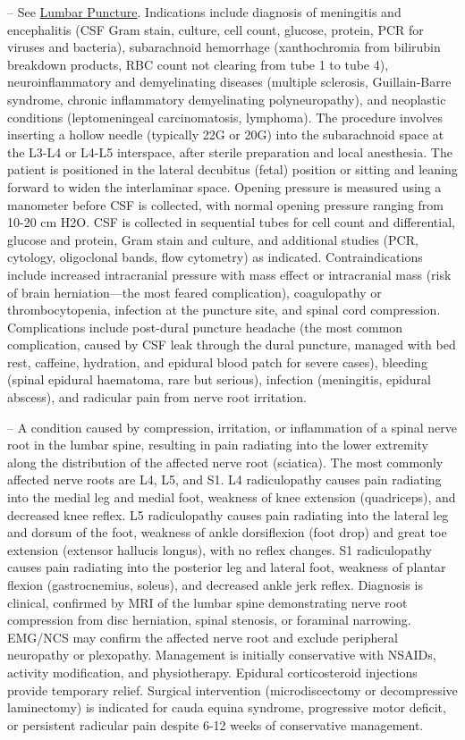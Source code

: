 -- See \hyperlink{Lumbar Puncture}{Lumbar Puncture}. Indications include diagnosis of meningitis and encephalitis (CSF Gram stain, culture, cell count, glucose, protein, PCR for viruses and bacteria), subarachnoid hemorrhage (xanthochromia from bilirubin breakdown products, RBC count not clearing from tube 1 to tube 4), neuroinflammatory and demyelinating diseases (multiple sclerosis, Guillain-Barre syndrome, chronic inflammatory demyelinating polyneuropathy), and neoplastic conditions (leptomeningeal carcinomatosis, lymphoma). The procedure involves inserting a hollow needle (typically 22G or 20G) into the subarachnoid space at the L3-L4 or L4-L5 interspace, after sterile preparation and local anesthesia. The patient is positioned in the lateral decubitus (fetal) position or sitting and leaning forward to widen the interlaminar space. Opening pressure is measured using a manometer before CSF is collected, with normal opening pressure ranging from 10-20 cm H2O. CSF is collected in sequential tubes for cell count and differential, glucose and protein, Gram stain and culture, and additional studies (PCR, cytology, oligoclonal bands, flow cytometry) as indicated. Contraindications include increased intracranial pressure with mass effect or intracranial mass (risk of brain herniation—the most feared complication), coagulopathy or thrombocytopenia, infection at the puncture site, and spinal cord compression. Complications include post-dural puncture headache (the most common complication, caused by CSF leak through the dural puncture, managed with bed rest, caffeine, hydration, and epidural blood patch for severe cases), bleeding (spinal epidural haematoma, rare but serious), infection (meningitis, epidural abscess), and radicular pain from nerve root irritation.

-- A condition caused by compression, irritation, or inflammation of a spinal nerve root in the lumbar spine, resulting in pain radiating into the lower extremity along the distribution of the affected nerve root (sciatica). The most commonly affected nerve roots are L4, L5, and S1. L4 radiculopathy causes pain radiating into the medial leg and medial foot, weakness of knee extension (quadriceps), and decreased knee reflex. L5 radiculopathy causes pain radiating into the lateral leg and dorsum of the foot, weakness of ankle dorsiflexion (foot drop) and great toe extension (extensor hallucis longus), with no reflex changes. S1 radiculopathy causes pain radiating into the posterior leg and lateral foot, weakness of plantar flexion (gastrocnemius, soleus), and decreased ankle jerk reflex. Diagnosis is clinical, confirmed by MRI of the lumbar spine demonstrating nerve root compression from disc herniation, spinal stenosis, or foraminal narrowing. EMG/NCS may confirm the affected nerve root and exclude peripheral neuropathy or plexopathy. Management is initially conservative with NSAIDs, activity modification, and physiotherapy. Epidural corticosteroid injections provide temporary relief. Surgical intervention (microdiscectomy or decompressive laminectomy) is indicated for cauda equina syndrome, progressive motor deficit, or persistent radicular pain despite 6-12 weeks of conservative management.

